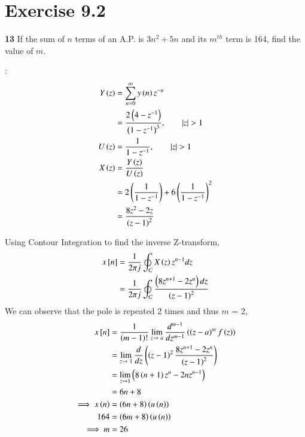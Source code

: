 \documentclass[journal,12pt,twocolumn]{IEEEtran}
\begin{document}


\vspace{3cm}

\title{}
\author{EE23BTECH11054 -  Sai Krishna Shanigarapu$^{*}$
}
\maketitle
\newpage
\bigskip


\section*{Exercise 9.2}

\noindent \textbf{13} \hspace{2pt}If the sum of $n$ terms of an A.P. is $3n^2+5n$ and its $m^{th}$ term is 164, find the value of $m$.
\bigskip

\solution:
\noindent
\begin{align}
Y\brak{z} &=  \sum_{n=0}^{\infty} y\brak{n}z^{-n} \\
&= \frac{2\brak{4-z^{-1}}}{\brak{1-z^{-1}}^3}, \qquad |z| > 1\\
U\brak{z} &= \frac{1}{1-z^{-1}}, \qquad |z| > 1\\
X\brak{z} &=  \frac{Y\brak{z}}{U\brak{z}}\\
 &= 2\left(\frac{1}{1-z^{-1}}\right) + 6\left(\frac{1}{1-z^{-1}}\right) ^2 \\
 &= \frac{8z^2 - 2z}{\brak{z-1}^2} %
\end{align}


Using Contour Integration to find the inverse Z-transform,
\begin{align}
    x{}\left[n\right] &= \frac{1}{2\pi j}\oint_C X\left(z\right)z^{n-1}dz\\
    &= \frac{1}{2\pi j}\oint_C \frac{\left(8z^{n+1} - 2z^{n}\right)dz}{\left(z-1\right)^2}
\end{align}
We can observe that the pole is repeated 2 times and thus $m$ = 2,
\begin{align}
    x{}\left[n\right] &= \frac{1}{\left(m-1\right)!}\lim_{z\to\ a}\frac{d^{m-1}}{dz^{m-1}}\left(\left(z-a\right)^m f\left(z\right)\right)\\
    &= \lim_{z\to\ 1}\frac{d}{dz}\left(\left(z-1\right)^2 \frac{8z^{n+1} - 2z^n}{\left(z-1\right)^2}\right)\\
    &= \lim_{z\to 1}\left(8\left(n+1\right)z^n - 2nz^{n-1}\right)\\
    &= 6n+8\\
    \implies x\left(n\right) &= \left(6n+8\right)\left(u\left(n\right)\right)\\
    164 &= \left(6m+8\right)\left(u\left(n\right)\right)\\
    \implies m &= 26
\end{align}
\end{document}
